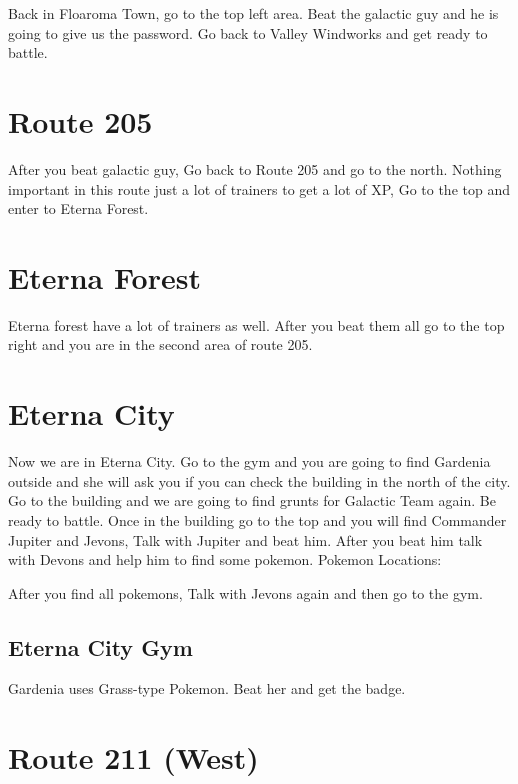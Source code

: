 \documentclass[11pt]{article}
\begin{document}
Back in Floaroma Town, go to the top left area.
Beat the galactic guy and he is going to give us the password.
Go back to Valley Windworks and get ready to battle.

\section{Route 205}\label{sec:Route_205}

After you beat galactic guy, Go back to Route 205 and go to the north.
Nothing important in this route just a lot of trainers to get a lot of XP,
Go to the top and enter to Eterna Forest.




\section{Eterna Forest}\label{sec:Eterna_Forest}

Eterna forest have a lot of trainers as well.
After you beat them all go to the top right and you are in the second area of route 205.




\section{Eterna City}\label{sec:eterna-city}
Now we are in Eterna City.
Go to the gym and you are going to find Gardenia outside and she will ask you
if you can check the building in the north of the city.
Go to the building and we are going to find grunts for Galactic Team again.
Be ready to battle.
Once in the building go to the top and you will find
Commander Jupiter and Jevons, Talk with Jupiter and beat him.
After you beat him talk with Devons and help him to find some pokemon.
Pokemon Locations:

After you find all pokemons, Talk with Jevons again and then go to the gym.

\subsection{Eterna City Gym}\label{subsec:eterna-city-gym}
Gardenia uses Grass-type Pokemon.
Beat her and get the badge.

\section{Route 211 (West)}\label{sec:Route_211_(West)}
\end{document}
